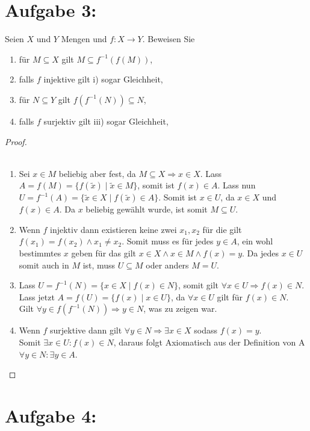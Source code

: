 \documentclass{exam}
\begin{document}
\section*{Aufgabe 3:}
Seien $X$ und $Y$ Mengen und $f : X \rightarrow Y$. Beweisen Sie
\begin{enumerate}[label=\roman*)]
	\item für $M \subseteq X$ gilt $M \subseteq f^{-1}(f(M))$,
	\item falls $f$ injektive gilt i) sogar Gleichheit,
	\item für $N \subseteq Y$ gilt $f(f^{-1}(N)) \subseteq N$,
	\item falls $f$ surjektiv gilt iii) sogar Gleichheit,
\end{enumerate}
\begin{proof} \\\
	\begin{enumerate}[label=\roman*)]
		\item
		      Sei $x \in M$ beliebig aber fest, da $M \subseteq X \Rightarrow x \in X$.
		      Lass $A = f(M) = \{f(\tilde{x}) \mid \tilde{x} \in M\}$, somit ist $f(x) \in A$.
		      Lass nun $U = f^{-1}(A) = \{\tilde{x} \in X \mid f(\tilde{x}) \in A\}$.
		      Somit ist $x \in U$, da $x \in X$ und $f(x) \in A$.
		      Da $x$ beliebig gewählt wurde, ist somit $M \subseteq U$. \checkmark
		\item
		      Wenn $f$ injektiv dann existieren keine zwei $x_1, x_2$ für die gilt $f(x_1) = f(x_2) \land x_1 \not= x_2$.
		      Somit muss es für jedes $y \in A$, ein wohl bestimmtes $x$ geben für das gilt $x \in X \land x \in M \land f(x) = y$.
		      Da jedes $x \in U$ somit auch in $M$ ist, muss $U \subseteq M$ oder anders $M = U$. \checkmark
		\item
		      Lass $U = f^{-1}(N) = \{x \in X \mid f(x) \in N\}$, somit gilt $\forall x \in U \Rightarrow f(x) \in N$. \\
		      Lass jetzt $A = f(U) = \{f(x) \mid x \in U\}$, da $\forall x \in U$ gilt für $f(x) \in N$. \\
		      Gilt $\forall y \in f(f^{-1}(N)) \Rightarrow y \in N$, was zu zeigen war. \checkmark
		\item
		      Wenn $f$ surjektive dann gilt $\forall y \in N \Rightarrow \exists x \in X$ sodass $f(x) = y$. \\
		      Somit $\exists x \in U: f(x) \in N$, daraus folgt Axiomatisch aus der Definition von A $\forall y \in N: \exists y \in A$. \checkmark
	\end{enumerate}
\end{proof}

\pagebreak

\section*{Aufgabe 4:}
\end{document}
